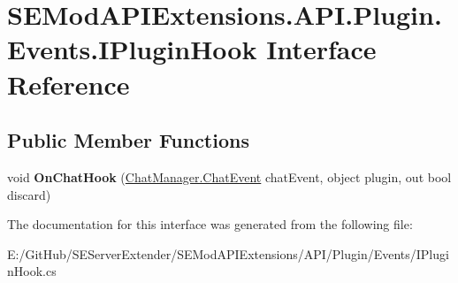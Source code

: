 \hypertarget{interface_s_e_mod_a_p_i_extensions_1_1_a_p_i_1_1_plugin_1_1_events_1_1_i_plugin_hook}{}\section{S\+E\+Mod\+A\+P\+I\+Extensions.\+A\+P\+I.\+Plugin.\+Events.\+I\+Plugin\+Hook Interface Reference}
\label{interface_s_e_mod_a_p_i_extensions_1_1_a_p_i_1_1_plugin_1_1_events_1_1_i_plugin_hook}
\subsection*{Public Member Functions}
\begin{DoxyCompactItemize}
\item 
\hypertarget{interface_s_e_mod_a_p_i_extensions_1_1_a_p_i_1_1_plugin_1_1_events_1_1_i_plugin_hook_a6f05ecb3273d5f649e64ea2f2dcd1963}{}void {\bfseries On\+Chat\+Hook} (\hyperlink{struct_s_e_mod_a_p_i_extensions_1_1_a_p_i_1_1_chat_manager_1_1_chat_event}{Chat\+Manager.\+Chat\+Event} chat\+Event, object plugin, out bool discard)\label{interface_s_e_mod_a_p_i_extensions_1_1_a_p_i_1_1_plugin_1_1_events_1_1_i_plugin_hook_a6f05ecb3273d5f649e64ea2f2dcd1963}

\end{DoxyCompactItemize}


The documentation for this interface was generated from the following file\+:\begin{DoxyCompactItemize}
\item 
E\+:/\+Git\+Hub/\+S\+E\+Server\+Extender/\+S\+E\+Mod\+A\+P\+I\+Extensions/\+A\+P\+I/\+Plugin/\+Events/I\+Plugin\+Hook.\+cs\end{DoxyCompactItemize}
